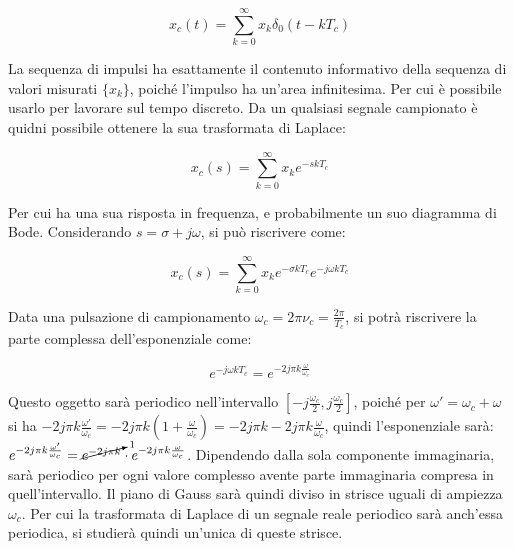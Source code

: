 \documentclass{article}
\numberwithin{equation}{subsection}
\begin{document}
\begin{equation}
    x_c(t)=\sum_{k=0}^{\infty}x_k\delta_0(t-kT_c)
\end{equation}

\begin{center}
\end{center}

La sequenza di impulsi ha esattamente il contenuto informativo della sequenza di valori misurati $\{x_k\}$, poiché l'impulso ha un'area infinitesima. Per cui è possibile 
usarlo per lavorare sul tempo discreto. Da un qualsiasi segnale campionato è quidni possibile ottenere la sua trasformata di Laplace:

\begin{equation}
    x_c(s)=\sum_{k=0}^{\infty}\displaystyle{x_k}e^{-skT_c}
\end{equation}

Per cui ha una sua risposta in frequenza, e probabilmente un suo diagramma di Bode. Considerando $s=\sigma +j\omega$, si può riscrivere come: 

\begin{equation}
    x_c(s)=\sum_{k=0}^{\infty}x_ke^{-\sigma kT_c}e^{-j\omega kT_c}
\end{equation}

Data una pulsazione di campionamento $\omega_c=2\pi\nu_c=\displaystyle\frac{2\pi}{T_c}$, si potrà riscrivere la parte complessa dell'esponenziale come:

\begin{equation}
    e^{-j\omega kT_c}=e^{-2j\pi k\frac{\omega}{\omega_c}}
\end{equation}

Questo oggetto sarà periodico nell'intervallo $\left[\displaystyle-j\frac{\omega_c}{2},j\frac{\omega_c}{2}\right]$, poiché per $\omega'=\omega_c+\omega$ si ha 
$-2j\pi k\displaystyle\frac{\omega'}{\omega_c}=-2j\pi k\left(1+\frac{\omega}{\omega_c}\right)=-2j\pi k-2j\pi k\frac{\omega}{\omega_c}$, quindi l'esponenziale sarà: 
$e^{-2j\pi k\frac{\omega'}{\omega_c}}=\cancelto{1}{e^{-2j\pi k}}\cdot e^{-2j\pi k\frac{\omega}{\omega_c}}$. Dipendendo dalla sola componente immaginaria, sarà 
periodico per ogni valore complesso avente parte immaginaria compresa in quell'intervallo. Il piano di Gauss sarà quindi diviso in strisce uguali di ampiezza $\omega_c$. 
Per cui la trasformata di Laplace di un segnale reale periodico sarà anch'essa periodica, si studierà quindi un'unica di queste strisce. 
\end{document}
